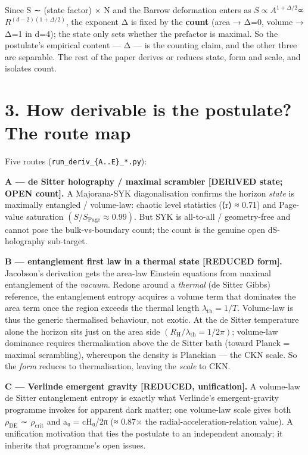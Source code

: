 \documentclass[
  10pt,
]{article}
\begin{document}
Since S ∼ (state factor) × N and the Barrow deformation enters as
\(S \propto  A^{1+\Delta /2}\)∝ \(R^{(d-2)(1+\Delta /2)}\), the exponent
Δ is fixed by the \textbf{count} (area → Δ=0, volume → Δ=1 in d=4); the
state only sets whether the prefactor is maximal. So the postulate's
empirical content --- Δ --- is the counting claim, and the other three
are separable. The rest of the paper derives or reduces state, form and
scale, and isolates count.

\section{3. How derivable is the postulate? The route
map}\label{how-derivable-is-the-postulate-the-route-map}

Five routes (\texttt{run\_deriv\_\{A..E\}\_*.py}):

\textbf{A --- de Sitter holography / maximal scrambler {[}DERIVED state;
OPEN count{]}.} A Majorana-SYK diagonalisation confirms the horizon
\emph{state} is maximally entangled / volume-law: chaotic level
statistics (⟨r⟩ ≈ 0.71) and Page-value saturation
\((S/S_{\mathrm{Page}} \approx  0.99)\). But SYK is all-to-all /
geometry-free and cannot pose the bulk-vs-boundary count; the count is
the genuine open dS-holography sub-target.

\textbf{B --- entanglement first law in a thermal state {[}REDUCED
form{]}.} Jacobson's derivation gets the area-law Einstein equations
from maximal entanglement of the \emph{vacuum}. Redone around a
\emph{thermal} (de Sitter Gibbs) reference, the entanglement entropy
acquires a volume term that dominates the area term once the region
exceeds the thermal length \(\lambda _{\mathrm{th}} = 1/T\). Volume-law
is thus the generic thermalised behaviour, not exotic. At the de Sitter
temperature alone the horizon sits just on the area side
\((R_{\mathrm{H}}/\lambda _{\mathrm{th}} = 1/2\pi )\); volume-law
dominance requires thermalisation above the de Sitter bath (toward
Planck = maximal scrambling), whereupon the density is Planckian --- the
CKN scale. So the \emph{form} reduces to thermalisation, leaving the
\emph{scale} to CKN.

\textbf{C --- Verlinde emergent gravity {[}REDUCED, unification{]}.} A
volume-law de Sitter entanglement entropy is exactly what Verlinde's
emergent-gravity programme invokes for apparent dark matter; one
volume-law scale gives both \(\rho _{\mathrm{DE}}\) ∼
\(\rho _{\mathrm{crit}}\) and a₀ = cH₀/2π (≈ 0.87× the
radial-acceleration-relation value). A unification motivation that ties
the postulate to an independent anomaly; it inherits that programme's
open issues.
\end{document}
